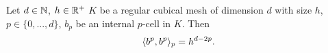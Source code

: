 \begin{example}
  Let
    $d \in \mathbb{N}$,
    $h \in \mathbb{R}^+$
    $K$ be a regular cubical mesh of dimension $d$ with size $h$,
    $p \in \{0, ..., d\}$,
    $b_p$ be an internal $p$-cell in $K$.
  Then
  \begin{equation}
    \langle b^p,b^p\rangle_p = h^{d - 2 p}.
  \end{equation}
\end{example}
